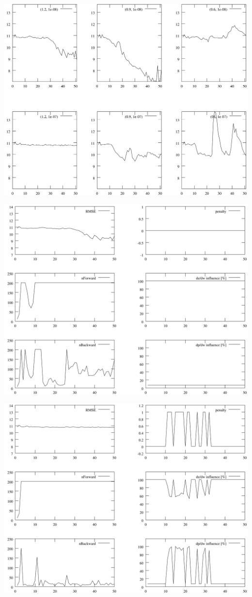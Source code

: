 \documentclass{beamer}
\begin{document}
\begin{frame}
	\includegraphics[scale=0.065]{img/rmse}
\end{frame}
\begin{frame}
	\includegraphics[scale=0.065]{img/params_set1}
\end{frame}
\begin{frame}
	\includegraphics[scale=0.065]{img/params_set2}
\end{frame}
\end{document}
